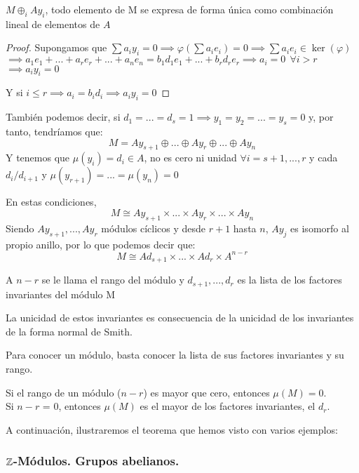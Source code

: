 \begin{nprop}
	$M \oplus_i Ay_i$, todo elemento de M se expresa de forma única como combinación lineal de elementos de $A$
\end{nprop}
\begin{proof}
	Supongamos que $\sum a_i y_i = 0 \implies \varphi(\sum a_i e_i ) = 0 \implies \sum a_ie_i \in \ker (\varphi) $\\
	$\implies a_1e_1+...+ a_re_r+...+a_ne_n = b_1d_1e_1+...+b_rd_re_r \implies a_i = 0 \ \ \forall i > r$\\
	$\implies a_iy_i = 0$

	Y si $i \leq r\implies a_i = b_id_i \implies a_iy_i = 0$
\end{proof}
También podemos decir, si $d_1 = ... = d_s = 1 \implies y_1 = y_2 = ... = y_s = 0$ y, por tanto, tendríamos que:
\[
M = Ay_{s+1}  \oplus ... \oplus Ay_r \oplus ... \oplus Ay_n
\]
Y tenemos que $\mu(y_i) = d_i \in A$, no es cero ni unidad $\forall i = s+1,...,r$ y cada $d_i/d_{i+1}$ y $\mu(y_{r+1}) = ... =\mu(y_n) = 0$

\begin{nth}
	En estas condiciones,
	\[
	M \cong Ay_{s+1} \times ... \times Ay_r \times ... \times Ay_n
	\]
	Siendo $Ay_{s+1},..., Ay_r$ módulos cíclicos y desde $r+1$ hasta $n$, $Ay_j$ es isomorfo al propio anillo, por lo que podemos decir que:
	\[
	M \cong Ad_{s+1}\times ... \times Ad_r \times A^{n-r}
	\]
\end{nth}

A $n-r$ se le llama el rango del módulo y $d_{s+1},...,d_r$ es la lista de los factores invariantes del módulo M

La unicidad de estos invariantes es consecuencia de la unicidad de los invariantes de la forma normal de Smith.

\begin{ncor}
	Para conocer un módulo, basta conocer la lista de sus factores invariantes y su rango.
\end{ncor}
\begin{ncor}
	Si el rango de un módulo ($n-r$) es mayor que cero, entonces $\mu(M) = 0$.\\

	Si $n-r$ = 0, entonces $\mu(M) $ es el mayor de los factores invariantes, el $d_r$.
\end{ncor}

A continuación, ilustraremos el teorema que hemos visto con varios ejemplos:

\subsubsection{$\mathbb{Z}$-Módulos. Grupos abelianos.}

